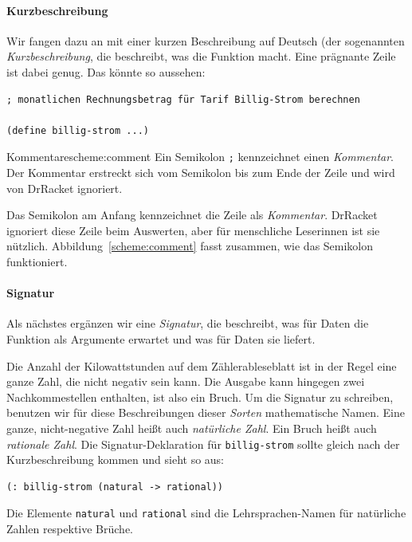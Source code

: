 \paragraph{Kurzbeschreibung}
Wir fangen dazu an mit einer kurzen Beschreibung auf Deutsch (der
sogenannten \textit{Kurzbeschreibung}, die
beschreibt, was die Funktion macht.  Eine prägnante Zeile ist dabei
genug.  Das könnte so aussehen:
%
\begin{verbatim}
; monatlichen Rechnungsbetrag für Tarif Billig-Strom berechnen

(define billig-strom ...)
\end{verbatim}
%
\begin{feature}{Kommentare}{scheme:comment}
  Ein Semikolon \texttt{;} kennzeichnet einen 
  \textit{Kommentar}.  Der Kommentar erstreckt sich
  vom Semikolon bis zum Ende der Zeile und wird von DrRacket
  ignoriert.
\end{feature}
%
Das Semikolon am Anfang kennzeichnet die Zeile als
\textit{Kommentar}. DrRacket ignoriert diese Zeile
beim Auswerten, aber für menschliche Leserinnen ist sie nützlich.
Abbildung~\ref{scheme:comment} fasst zusammen, wie das Semikolon
funktioniert.

\paragraph{Signatur} Als nächstes ergänzen wir eine \textit{Signatur}, die
beschreibt, was für Daten die Funktion als Argumente erwartet und was
für Daten sie liefert.

Die Anzahl der Kilowattstunden auf dem Zählerableseblatt ist in der
Regel eine ganze Zahl, die nicht negativ sein kann.  Die Ausgabe kann
hingegen zwei Nachkommestellen enthalten, ist also ein Bruch.  Um die
Signatur zu schreiben, benutzen wir für diese Beschreibungen dieser
\textit{Sorten} mathematische Namen.  Eine ganze,
nicht-negative Zahl heißt auch \textit{natürliche
  Zahl}.  Ein Bruch heißt auch
\textit{rationale Zahl}.  Die
Signatur-Deklaration für \texttt{billig-strom} sollte gleich nach der
Kurzbeschreibung kommen und sieht so aus:
%
\begin{verbatim}
(: billig-strom (natural -> rational))
\end{verbatim}
%
Die Elemente \texttt{natural} und \texttt{rational} sind die
Lehrsprachen-Namen für natürliche Zahlen respektive Brüche.

